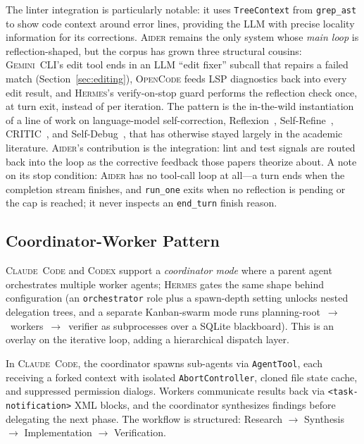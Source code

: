 \documentclass[11pt,a4paper]{article}
\newcommand{\clcode}{\textsc{Claude~Code}\xspace}
\newcommand{\cdx}{\textsc{Codex}\xspace}
\newcommand{\adr}{\textsc{Aider}\xspace}
\newcommand{\gemini}{\textsc{Gemini~CLI}\xspace}
\newcommand{\hrm}{\textsc{Hermes}\xspace}
\newcommand{\ocd}{\textsc{OpenCode}\xspace}
\begin{document}
The linter integration is particularly notable: it uses \texttt{TreeContext} from \texttt{grep\_ast} to show code context around error lines, providing the LLM with precise locality information for its corrections.
\adr{} remains the only system whose \emph{main loop} is reflection-shaped, but the corpus has grown three structural cousins: \gemini{}'s edit tool ends in an LLM ``edit fixer'' subcall that repairs a failed match (Section~\ref{sec:editing}), \ocd{} feeds LSP diagnostics back into every edit result, and \hrm{}'s verify-on-stop guard performs the reflection check once, at turn exit, instead of per iteration.
The pattern is the in-the-wild instantiation of a line of work on language-model self-correction, Reflexion~\cite{shinn2023reflexion}, Self-Refine~\cite{madaan2023selfrefine}, CRITIC~\cite{gou2024critic}, and Self-Debug~\cite{chen2024selfdebug}, that has otherwise stayed largely in the academic literature.
\adr{}'s contribution is the integration: lint and test signals are routed back into the loop as the corrective feedback those papers theorize about.
A note on its stop condition: \adr{} has no tool-call loop at all---a turn ends when the completion stream finishes, and \texttt{run\_one} exits when no reflection is pending or the cap is reached; it never inspects an \texttt{end\_turn} finish reason.

\subsection{Coordinator-Worker Pattern}

\clcode{} and \cdx{} support a \emph{coordinator mode} where a parent agent orchestrates multiple worker agents; \hrm{} gates the same shape behind configuration (an \texttt{orchestrator} role plus a spawn-depth setting unlocks nested delegation trees, and a separate Kanban-swarm mode runs planning-root~$\to$~workers~$\to$~verifier as subprocesses over a SQLite blackboard).
This is an overlay on the iterative loop, adding a hierarchical dispatch layer.

In \clcode{}, the coordinator spawns sub-agents via \texttt{AgentTool}, each receiving a forked context with isolated \texttt{AbortController}, cloned file state cache, and suppressed permission dialogs.
Workers communicate results back via \texttt{<task-notification>} XML blocks, and the coordinator synthesizes findings before delegating the next phase.
The workflow is structured: Research $\to$ Synthesis $\to$ Implementation $\to$ Verification.
\end{document}
